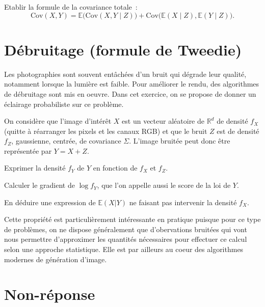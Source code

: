 Etablir la formule de la covariance totale~:
\[\text{Cov}(X,Y) = \mathbb{E}\bigl(\text{Cov}(X,Y\mid Z)\bigr) + \text{Cov}\bigl( \mathbb{E}(X\mid Z), \mathbb{E}(Y\mid Z) \bigr).\]


\section{Débruitage (formule de
Tweedie)}\label{III-duxe9bruitage-formule-de-tweedie}

Les photographies sont souvent entâchées d'un bruit qui dégrade leur
qualité, notamment lorsque la lumière est faible. Pour améliorer le
rendu, des algorithmes de débruitage sont mis en oeuvre. Dans cet
exercice, on se propose de donner un éclairage probabiliste sur ce
problème.

On considère que l'image d'intérêt \(X\) est un vecteur aléatoire de
\(\mathbb{R}^d\) de densité \(f_X\) (quitte à réarranger les pixels et
les canaux RGB) et que le bruit \(Z\) est de densité \(f_Z\),
gaussienne, centrée, de covariance \(\Sigma\). L'image bruitée peut donc
être représentée par \(Y = X + Z\).

\label{III-tweedie1}
Exprimer la densité \(f_Y\) de \(Y\) en fonction de \(f_X\) et
\(f_Z\).

\label{III-tweedie2}
Calculer le gradient de \(\log f_Y\), que l'on appelle aussi le score de
la loi de \(Y\).

\label{III-tweedie3}
En déduire une expression de \(\mathbb{E}(X|Y)\) ne faisant pas
intervenir la densité \(f_X\).

Cette propriété est particulièrement intéressante en pratique puisque
pour ce type de problèmes, on ne dispose généralement que d'obervations
bruitées qui vont nous permettre d'approximer les quantités nécessaires
pour effectuer ce calcul selon une approche statistique. Elle est par
ailleurs au coeur des algorithmes modernes de génération
d'image.

\section{Non-réponse}\label{III-non-ruxe9ponse}


